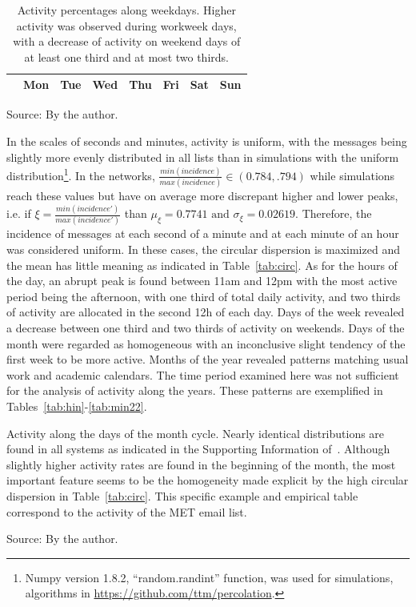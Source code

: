 \begin{table}
\caption{Activity percentages along weekdays.
Higher activity was observed during workweek days, with a decrease of activity on weekend days of at least one third and at most two thirds.}
\begin{center}
\begin{tabular}{ l ||  c | c | c | c | c |c | c}
\hline
& Mon & Tue & Wed & Thu & Fri & Sat & Sun  \\ \hline\hline

\end{tabular}
\end{center}
\label{tab:win}
\begin{flushleft}\footnotesize
Source: By the author.\
\end{flushleft}
\end{table}

In the scales of seconds and minutes, activity is uniform,
with the messages being slightly more evenly distributed in all lists than in simulations with the uniform distribution\footnote{Numpy version 1.8.2, ``random.randint'' function, was used for simulations, algorithms in \url{https://github.com/ttm/percolation}.}.
In the networks, $\frac{min(incidence)}{max(incidence)} \in (0.784,.794)$ while simulations reach these values but have on average more discrepant higher and lower peaks, i.e. if $\xi=\frac{min(incidence')}{max(incidence')}$ than $\mu_\xi=0.7741 \text{ and } \sigma_\xi=0.02619$.
Therefore, the incidence of messages at each second of a minute and at each minute of an hour was considered uniform.
In these cases, the circular dispersion is maximized and the mean has little meaning as indicated in Table~\ref{tab:circ}.
As for the hours of the day, an abrupt peak is found between 11am and 12pm with the most active period being the afternoon, with one third of total daily activity, and two thirds of activity are allocated in the second 12h of each day. Days of the week revealed a decrease between one third and two thirds of activity on weekends.
Days of the month were regarded as homogeneous with an inconclusive slight tendency of the first week to be more active.
Months of the year revealed patterns matching usual work and academic calendars. The time period examined here was not sufficient for the analysis of activity along the years. These patterns are exemplified in Tables~\ref{tab:hin}-\ref{tab:min22}.


\FloatBarrier

\begin{table}
\caption{Activity along the days of the month cycle.
Nearly identical distributions are found in all systems
as indicated in the Supporting Information of~\cite{stab}. Although slightly higher activity rates are found in the beginning of the month, the most important feature seems to be the homogeneity made explicit by the high circular dispersion in Table~\ref{tab:circ}.
This specific example and empirical table correspond to the activity of the MET email list.}
\footnotesize

\label{tab:min}
\begin{flushleft}\footnotesize
Source: By the author.\
\end{flushleft}
\end{table}

